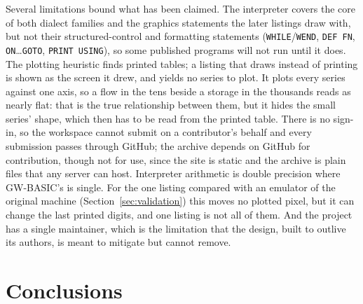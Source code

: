 Several limitations bound what has been claimed. The interpreter covers the core of both dialect families and the graphics statements the later listings draw with, but not their structured-control and formatting statements (\texttt{WHILE}/\texttt{WEND}, \texttt{DEF FN}, \texttt{ON}\ldots\texttt{GOTO}, \texttt{PRINT USING}), so some published programs will not run until it does. The plotting heuristic finds printed tables; a listing that draws instead of printing is shown as the screen it drew, and yields no series to plot. It plots every series against one axis, so a flow in the tens beside a storage in the thousands reads as nearly flat: that is the true relationship between them, but it hides the small series' shape, which then has to be read from the printed table. There is no sign-in, so the workspace cannot submit on a contributor's behalf and every submission passes through GitHub; the archive depends on GitHub for contribution, though not for use, since the site is static and the archive is plain files that any server can host. Interpreter arithmetic is double precision where GW-BASIC's is single. For the one listing compared with an emulator of the original machine (Section~\ref{sec:validation}) this moves no plotted pixel, but it can change the last printed digits, and one listing is not all of them. And the project has a single maintainer, which is the limitation that the design, built to outlive its authors, is meant to mitigate but cannot remove.

\section{Conclusions}
\label{sec:conclusions}

